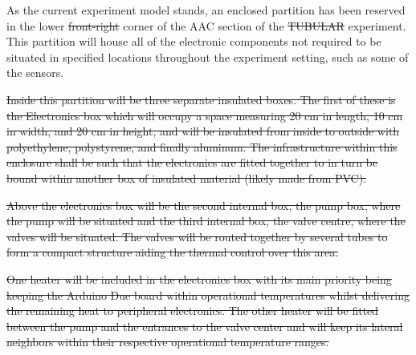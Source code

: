 \documentclass[a4paper,12pt,twoside]{article}
\providecommand{\DIFaddtex}[1]{{\protect\color{blue}\uwave{#1}}} %
\providecommand{\DIFdeltex}[1]{{\protect\color{red}\sout{#1}}}                      %
\providecommand{\DIFaddbegin}{} %
\providecommand{\DIFaddend}{} %
\providecommand{\DIFdelbegin}{} %
\providecommand{\DIFdelend}{} %
\providecommand{\DIFadd}[1]{\texorpdfstring{\DIFaddtex{#1}}{#1}} %
\providecommand{\DIFdel}[1]{\texorpdfstring{\DIFdeltex{#1}}{}} %
\newcommand{\DIFscaledelfig}{0.5}
\newlength{\DIFdelgraphicswidth} %
\newlength{\DIFdelgraphicsheight} %
\newcommand{\DIFaddincludegraphics}[2][]{{\color{blue}\fbox{\DIFOincludegraphics[#1]{#2}}}} %
\newcommand{\DIFdelincludegraphics}[2][]{%
\sbox{\DIFdelgraphicsbox}{\DIFOincludegraphics[#1]{#2}}%
\settoboxwidth{\DIFdelgraphicswidth}{\DIFdelgraphicsbox} %
\settoboxtotalheight{\DIFdelgraphicsheight}{\DIFdelgraphicsbox} %
\scalebox{\DIFscaledelfig}{%
\parbox[b]{\DIFdelgraphicswidth}{\usebox{\DIFdelgraphicsbox}\\[-\baselineskip] \rule{\DIFdelgraphicswidth}{0em}}\llap{\resizebox{\DIFdelgraphicswidth}{\DIFdelgraphicsheight}{%
\setlength{\unitlength}{\DIFdelgraphicswidth}%
\begin{picture}(1,1)%
\thicklines\linethickness{2pt} %
{\color[rgb]{1,0,0}\put(0,0){\framebox(1,1){}}}%
{\color[rgb]{1,0,0}\put(0,0){\line( 1,1){1}}}%
{\color[rgb]{1,0,0}\put(0,1){\line(1,-1){1}}}%
\end{picture}%
}\hspace*{3pt}}} %
} %
\DeclareRobustCommand{\DIFaddbegin}{\DIFOaddbegin \let\includegraphics\DIFaddincludegraphics} %
\DeclareRobustCommand{\DIFaddend}{\DIFOaddend \let\includegraphics\DIFOincludegraphics} %
\DeclareRobustCommand{\DIFdelbegin}{\DIFOdelbegin \let\includegraphics\DIFdelincludegraphics} %
\DeclareRobustCommand{\DIFdelend}{\DIFOaddend \let\includegraphics\DIFOincludegraphics} %
\begin{document}
\DIFdelend As the current experiment model stands, an enclosed partition has been reserved in the lower \DIFdelbegin \DIFdel{front-right }\DIFdelend \DIFaddbegin \DIFadd{front left-hand }\DIFaddend corner of the AAC section of the \DIFdelbegin \DIFdel{TUBULAR }\DIFdelend experiment. This partition will house all of the electronic components not required to be situated in specified locations throughout the experiment setting, such as some of the sensors.

\DIFdelbegin \DIFdel{Inside this partition will be three separate insulated boxes. The first of these is the Electronics box which will occupy a space measuring 20 cm in length, 10 cm in width, and 20 cm in height, and will be insulated from inside to outside with polyethylene, polystyrene, and finally aluminum. The infrastructure within this enclosure shall be such that the electronics are fitted together to in turn be bound within another box of insulated material (likely made from PVC). 
}%

\DIFdel{Above the electronics box will be the second internal box, the pump box, where the pump will be situated and the third internal box, the valve centre, where the valves will be situated. The valves will be routed together by several tubes to form a compact structure aiding the thermal control over this area. 
}%

\DIFdel{One heater will be included in the electronics box with its main priority being keeping the Arduino Due board within operational temperatures whilst delivering the remaining heat to peripheral electronics. The other heater will be fitted between the pump and the entrances to the valve center and will keep its lateral neighbors within their respective operational temperature ranges.
}%
\end{document}
